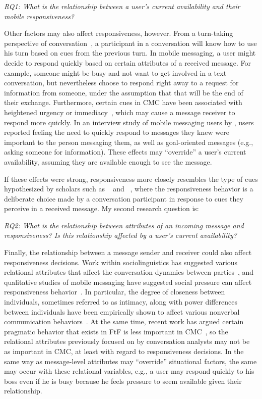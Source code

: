 \documentclass[12pt]{nuthesis}	%
\begin{document}
\textit{RQ1: What is the relationship between a user's current availability and their mobile responsiveness?}

Other factors may also affect responsiveness, however. From a turn-taking perspective of conversation~\citep{sacks1974simplest}, a participant in a conversation will know how to use his turn based on  cues from the previous turn. In mobile messaging, a user might decide to respond quickly based on certain attributes of a received message. For example, someone might be busy and not want to get involved in a text conversation, but nevertheless choose to respond right away to a request for information from someone, under the assumption that that will be the end of their exchange. Furthermore, certain cues in CMC have been associated with heightened urgency or immediacy~\citep{nguyen2014lexical}, which may cause a message receiver to respond more quickly. In an interview study of mobile messaging users by \citet{cui2016beyond}, users reported feeling the need to quickly respond to messages they knew were important to the person messaging them, as well as goal-oriented messages (e.g., asking someone for information). These effects may ``override'' a user's current availability, assuming they are available enough to see the message.

If these effects were strong, responsiveness more closely resembles the type of cues hypothesized by scholars such as ~\citet{walther1995nonverbal} and ~\citet{kalman2006pauses}, where the responsiveness behavior is a deliberate choice made by a conversation participant in response to cues they perceive in a received message. My second research question is:

\textit{RQ2: What is the relationship between attributes of an incoming message and responsiveness? Is this relationship affected by a user's current availability?}

Finally, the relationship between a message sender and receiver could also affect responsiveness decisions. Work within sociolinguistics has suggested various relational attributes that affect the conversation dynamics between parties~\citep{brown1987politeness,goldberg1990interrupting,west1979against,wolfson1990bulge}, and qualitative studies of mobile messaging have suggested social pressure can affect responsiveness behavior~\citep{church2013s,laursen2005please,tjora2011invisible,weilenmann2003can}. In particular, the degree of closeness between individuals, sometimes referred to as intimacy, along with power differences between individuals have been empirically shown to affect various nonverbal communication behaviors~\citep{guerrero1991waxing,henley1973power,leffler1982effects,sternglanz2004reading}.  At the same time, recent work has argued certain pragmatic behavior that exists in FtF is less important in CMC~\citep{schulze2017knowledge,stromer2015context}, so the relational attributes previously focused on by conversation analysts may not be as important in CMC, at least with regard to responsiveness decisions. In the same way as message-level attributes may ``override'' situational factors, the same may occur with these relational variables, e.g., a user may respond quickly to his boss even if he is busy because he feels pressure to seem available given their relationship.
\end{document}
